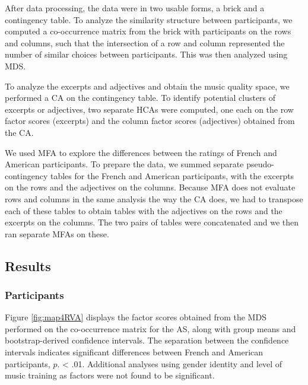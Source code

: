 \documentclass[
  english,
  man,floatsintext]{apa6}
\begin{document}
After data processing, the data were in two usable forms, a brick and a contingency table. To analyze the similarity structure between participants, we computed a co-occurrence matrix from the brick with participants on the rows and columns, such that the intersection of a row and column represented the number of similar choices between participants. This was then analyzed using MDS.

To analyze the excerpts and adjectives and obtain the music quality space, we performed a CA on the contingency table. To identify potential clusters of excerpts or adjectives, two separate HCAs were computed, one each on the row factor scores (excerpts) and the column factor scores (adjectives) obtained from the CA.

We used MFA to explore the differences between the ratings of French and American participants. To prepare the data, we summed separate pseudo-contingency tables for the French and American participants, with the excerpts on the rows and the adjectives on the columns. Because MFA does not evaluate rows and columns in the same analysis the way the CA does, we had to transpose each of these tables to obtain tables with the adjectives on the rows and the excerpts on the columns. The two pairs of tables were concatenated and we then ran separate MFAs on these.

\hypertarget{results-1}{%
\subsection{Results}\label{results-1}}

\hypertarget{participants-3}{%
\subsubsection{Participants}\label{participants-3}}


Figure \ref{fig:map4RVA} displays the factor scores obtained from the MDS performed on the co-occurrence matrix for the AS, along with group means and bootstrap-derived confidence intervals. The separation between the confidence intervals indicates significant differences between French and American participants, \(\textit{p}\). \textless{} .01. Additional analyses using gender identity and level of music training as factors were not found to be significant.
\end{document}
